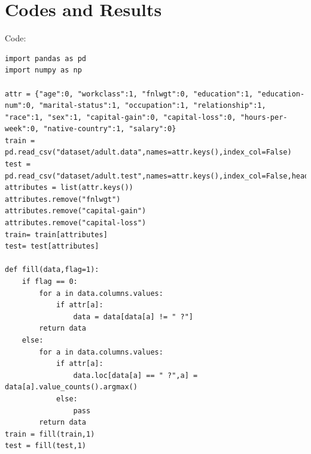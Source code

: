 \documentclass[a4paper, 11pt]{article}
\begin{document}
\section{Codes and Results}
Code:
\begin{lstlisting}
import pandas as pd
import numpy as np

attr = {"age":0, "workclass":1, "fnlwgt":0, "education":1, "education-num":0, "marital-status":1, "occupation":1, "relationship":1, "race":1, "sex":1, "capital-gain":0, "capital-loss":0, "hours-per-week":0, "native-country":1, "salary":0}
train = pd.read_csv("dataset/adult.data",names=attr.keys(),index_col=False)
test = pd.read_csv("dataset/adult.test",names=attr.keys(),index_col=False,header=0)
attributes = list(attr.keys())
attributes.remove("fnlwgt")
attributes.remove("capital-gain")
attributes.remove("capital-loss")
train= train[attributes]
test= test[attributes]

def fill(data,flag=1):
    if flag == 0:
        for a in data.columns.values:
            if attr[a]:
                data = data[data[a] != " ?"]
        return data
    else:
        for a in data.columns.values:
            if attr[a]:
                data.loc[data[a] == " ?",a] = data[a].value_counts().argmax()
            else:
                pass
        return data
train = fill(train,1)
test = fill(test,1)


\end{lstlisting}
\end{document}
